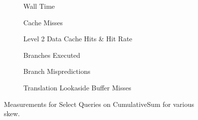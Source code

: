 \begin{figure}\tiny

\begin{subfigure}{0.48\textwidth}
	
	\caption{Wall Time}
	\label{fig:CumulativeSumSkew_n8as16_Select}
\end{subfigure}
\hfill
\begin{subfigure}{0.48\textwidth}
	
	\caption{Cache Misses}
	\label{fig:CumulativeSumSkew_n8as16_Select_CM}
\end{subfigure}

\begin{subfigure}{0.48\textwidth}
	
	\caption{Level 2 Data Cache Hits \& Hit Rate}
	\label{fig:CumulativeSumSkew_n8as16_Select_L2CH}
\end{subfigure}
\hfill
\begin{subfigure}{0.48\textwidth}
	
	\caption{Branches Executed}
	\label{fig:CumulativeSumSkew_n8as16_Select_BMExe}
\end{subfigure}

\begin{subfigure}{0.48\textwidth}
	
	\caption{Branch Mispredictions}
	\label{fig:CumulativeSumSkew_n8as16_Select_BM}
\end{subfigure}
\hfill
\begin{subfigure}{0.48\textwidth}
	
	\caption{Translation Lookaside Buffer Misses}
	\label{fig:CumulativeSumSkew_n8as16_Select_TLBM}
\end{subfigure}

\caption{Measurements for Select Queries on CumulativeSum for various skew.}
\label{fig:CumulativeSumSkew_n8as16_Select}
\end{figure}

\restoregeometry

\iffalse
{}

